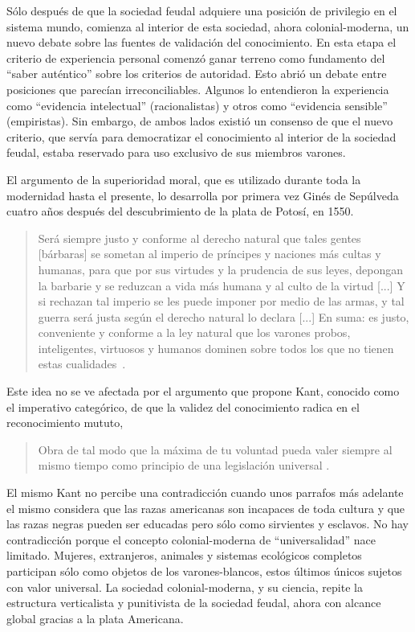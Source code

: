\documentclass[a4paper,10pt]{book}
\begin{document}

Sólo después de que la sociedad feudal adquiere una posición de privilegio  en el sistema mundo, comienza al interior de esta sociedad, ahora colonial-moderna, un nuevo debate sobre las fuentes de validación del conocimiento.
En esta etapa el criterio de experiencia personal comenzó ganar terreno como fundamento del ``saber auténtico'' sobre los criterios de autoridad.
Esto abrió un debate entre posiciones que parecían irreconciliables. 
Algunos lo entendieron la experiencia como ``evidencia intelectual'' (racionalistas) y otros como ``evidencia sensible'' (empiristas).
Sin embargo, de ambos lados existió un consenso de que el nuevo criterio, que servía para democratizar el conocimiento al interior de la sociedad feudal, estaba reservado para uso exclusivo de sus miembros varones.


El argumento de la superioridad moral, que es utilizado durante toda la modernidad hasta el presente, lo desarrolla por primera vez Ginés de Sepúlveda cuatro años después del descubrimiento de la plata de Potosí, en 1550.
\begin{quotation}
 Será siempre justo y conforme al derecho natural que tales gentes [bárbaras] se sometan al imperio de príncipes y naciones más cultas y humanas, para que por sus virtudes y la prudencia de sus leyes, depongan la barbarie y se reduzcan a vida más humana y al culto de la virtud [...] Y si rechazan tal imperio se les puede imponer por medio de las armas, y tal guerra será justa según el derecho natural lo declara [...] En suma: es justo, conveniente y conforme a la ley natural que los varones probos, inteligentes, virtuosos y humanos dominen sobre todos los que no tienen estas cualidades~\cite{GinesdeSepulveda1967p87}.
\end{quotation}
Este idea no se ve afectada por el argumento que propone Kant, conocido como el imperativo categórico, de que la validez del conocimiento radica en el reconocimiento mututo,
\begin{quotation}
Obra de tal modo que la máxima de tu voluntad pueda valer siempre al mismo tiempo como principio de una legislación universal \cite{Kant2003:28}.
\end{quotation}
El mismo Kant no percibe una contradicción cuando unos parrafos más adelante el mismo considera que las razas americanas son incapaces de toda cultura y que las razas negras pueden ser educadas pero sólo como sirvientes y esclavos.
No hay contradicción porque el concepto colonial-moderna de ``universalidad'' nace limitado.
Mujeres, extranjeros, animales y sistemas ecológicos completos participan sólo como objetos de los varones-blancos, estos últimos únicos sujetos con valor universal.
La sociedad colonial-moderna, y su ciencia, repite la estructura verticalista y punitivista de la sociedad feudal, ahora con alcance global gracias a la plata Americana.
\end{document}
